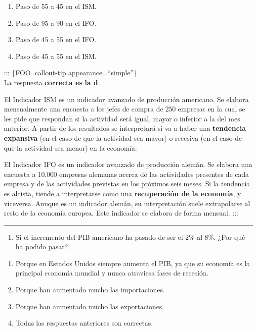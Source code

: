 \documentclass[
  letterpaper,
  DIV=11,
  numbers=noendperiod]{scrreprt}
\providecommand{\tightlist}{%
  \setlength{\itemsep}{0pt}\setlength{\parskip}{0pt}}\usepackage{longtable,booktabs,array}
\begin{document}
\begin{enumerate}
\def\labelenumi{\alph{enumi})}
\item
  Paso de 55 a 45 en el ISM.
\item
  Paso de 95 a 90 en el IFO.
\item
  Paso de 45 a 55 en el IFO.
\item
  Paso de 45 a 55 en el ISM.
\end{enumerate}

::: \{FOO .callout-tip appearance=``simple''\}\\
La respuesta \textbf{correcta es la d}.

El Indicador ISM es un indicador avanzado de producción americano. Se
elabora mensualmente una encuesta a los jefes de compra de 250 empresas
en la cual se les pide que respondan si la actividad será igual, mayor o
inferior a la del mes anterior. A partir de los resultados se
interpretará si va a haber una \textbf{tendencia expansiva} (en el caso
de que la actividad sea mayor) o recesiva (en el caso de que la
actividad sea menor) en la economía.

El Indicador IFO es un indicador avanzado de producción alemán. Se
elabora una encuesta a 10.000 empresas alemanas acerca de las
actividades presentes de cada empresa y de las actividades previstas en
los próximos seis meses. Si la tendencia es alcista, tiende a
interpretarse como una \textbf{recuperación de la economía}, y
viceversa. Aunque es un indicador alemán, su interpretación suele
extrapolarse al resto de la economía europea. Este indicador se elabora
de forma mensual. :::

\begin{center}\rule{0.5\linewidth}{0.5pt}\end{center}

\begin{enumerate}
\def\labelenumi{\arabic{enumi}.}
\setcounter{enumi}{3}
\tightlist
\item
  Si el incremento del PIB americano ha pasado de ser el 2\% al 8\%.
  ¿Por qué ha podido pasar?
\end{enumerate}

\begin{enumerate}
\def\labelenumi{\alph{enumi})}
\item
  Porque en Estados Unidos siempre aumenta el PIB, ya que su economía es
  la principal economía mundial y nunca atraviesa fases de recesión.
\item
  Porque han aumentado mucho las importaciones.
\item
  Porque han aumentado mucho las exportaciones.
\item
  Todas las respuestas anteriores son correctas.
\end{enumerate}
\end{document}
